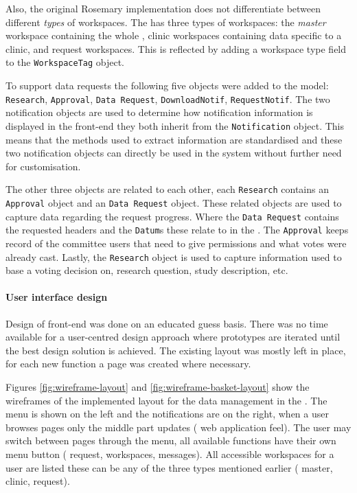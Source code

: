 Also, the original Rosemary implementation does not differentiate between different \emph{types} of workspaces. 
The \ivfsystem{} has three types of  workspaces: the \emph{master} workspace containing the whole \projectdata{}, clinic workspaces containing data specific to a clinic, and request workspaces.
This is reflected by adding a workspace type field to the {\tt WorkspaceTag} object.

To support data requests the following five objects were added to the model: {\tt Research}, {\tt Approval}, {\tt Data Request}, {\tt DownloadNotif}, {\tt RequestNotif}.
The two notification objects are used to determine how notification information is displayed in the front-end they both inherit from the {\tt Notification} object.
This means that the methods used to extract information are standardised and these two notification objects can directly be used in the system without further need for customisation.

The other three objects are related to each other, each {\tt Research} contains an {\tt Approval} object and an {\tt Data Request} object.
These related objects are used to capture data regarding the request progress.
Where the {\tt Data Request} contains the requested headers and the {\tt Datum}s these relate to in the \projectdata{}.
The {\tt Approval} keeps record of the committee users that need to give permissions and what votes were already cast.
Lastly, the {\tt Research} object is used to capture information used to base a voting decision on, \eg{} research question, study description, etc.

\paragraph{User interface design}
Design of front-end was done on an educated guess basis.
There was no time available for a user-centred design approach where prototypes are iterated until the best design solution is achieved.
The existing layout was mostly left in place, for each new function a page was created where necessary.

Figures \ref{fig:wireframe-layout} and \ref{fig:wireframe-basket-layout} show the wireframes of the implemented layout for the data management in the \ivfsystem{}.
The menu is shown on the left and the notifications are on the right, when a user browses pages only the middle part updates (\ie{} web application feel).
The user may switch between pages through the menu, all available functions have their own menu button (\eg{} request, workspaces, messages).
All accessible workspaces for a user are listed these can be any of the three types mentioned earlier (\ie{} master, clinic, request).

